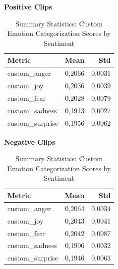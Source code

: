   \begin{table}[H]
    \centering
    \begin{subtable}{0.45\textwidth}
      \centering
      \caption*{\textbf{Positive Clips}}
      \begin{tabular}{lrr}
        \toprule
        \textbf{Metric}      & \textbf{Mean}  & \textbf{Std}   \\
        \midrule
        custom\_anger        & 0,2066         & 0,0031         \\
        custom\_joy          & 0,2036         & 0,0039         \\
        custom\_fear         & 0,2028         & 0,0079         \\
        custom\_sadness      & 0,1913         & 0,0027         \\
        custom\_surprise     & 0,1956         & 0,0062         \\
        \bottomrule
      \end{tabular}
    \end{subtable}\hfill
    \begin{subtable}{0.45\textwidth}
      \centering
      \caption*{\textbf{Negative Clips}}
      \begin{tabular}{lrr}
        \toprule
        \textbf{Metric}      & \textbf{Mean}  & \textbf{Std}   \\
        \midrule
        custom\_anger        & 0,2064         & 0,0034         \\
        custom\_joy          & 0,2043         & 0,0041         \\
        custom\_fear         & 0,2042         & 0,0087         \\
        custom\_sadness      & 0,1906         & 0,0032         \\
        custom\_surprise     & 0,1946         & 0,0063         \\
        \bottomrule
      \end{tabular}
    \end{subtable}
    \caption{Summary Statistics: Custom Emotion Categorization Scores by Sentiment}
    \label{tab:summary_praat_by_sentiment}
  \end{table}
  
  
  


